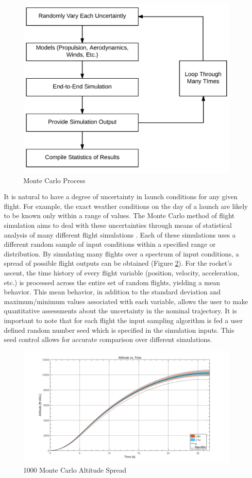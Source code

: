 \documentclass[10pt,a4paper]{article}
\begin{document}
\begin{figure}[H]
	\centering
	\includegraphics[width=.6\textwidth]{./figs/monte_carlo_process.png}
	\caption{Monte Carlo Process}
	\label{fig:monte_carlo_process}
\end{figure}
It is natural to have a degree of uncertainty in launch conditions for any given flight. For example, the exact weather conditions on the day of a launch are likely to be known only within a range of values. The Monte Carlo method of flight simulation aims to deal with these uncertainties through means of statistical analysis of many different flight simulations \cite{monte_carlo}. Each of these simulations uses a different random sample of input conditions within a specified range or distribution. By simulating many flights over a spectrum of input conditions, a spread of possible flight outputs can be obtained (Figure \ref{fig:flight_spread}). For the rocket's ascent, the time history of every flight variable (position, velocity, acceleration, etc.) is processed across the entire set of random flights, yielding a mean behavior. This mean behavior, in addition to the standard deviation and maximum/minimum values associated with each variable, allows the user to make quantitative assessments about the uncertainty in the nominal trajectory. It is important to note that for each flight the input sampling algorithm is fed a user defined random number seed which is specified in the simulation inputs. This seed control allows for accurate comparison over different simulations. 

\begin{figure}[H]
	\centering
	\includegraphics[width=1\textwidth]{./figs/flight_spread.png}
	\caption{1000 Monte Carlo Altitude Spread}
	\label{fig:flight_spread}
\end{figure}
\end{document}
